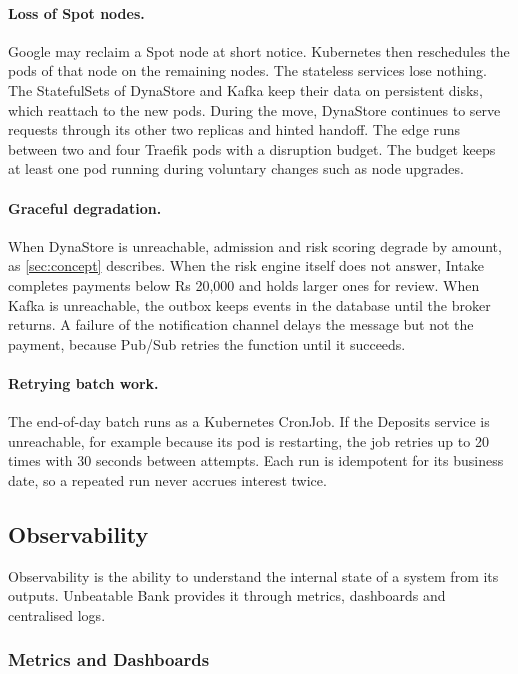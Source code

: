 \documentclass[11pt,a4paper]{article}
\newcommand{\project}{Unbeatable Bank}
\begin{document}
\paragraph{Loss of Spot nodes.} Google may reclaim a Spot node at short notice. Kubernetes then reschedules the pods of that node on the remaining nodes. The stateless services lose nothing. The StatefulSets of DynaStore and Kafka keep their data on persistent disks, which reattach to the new pods. During the move, DynaStore continues to serve requests through its other two replicas and hinted handoff. The edge runs between two and four Traefik pods with a disruption budget. The budget keeps at least one pod running during voluntary changes such as node upgrades.

\paragraph{Graceful degradation.} When DynaStore is unreachable, admission and risk scoring degrade by amount, as \cref{sec:concept} describes. When the risk engine itself does not answer, Intake completes payments below Rs 20,000 and holds larger ones for review. When Kafka is unreachable, the outbox keeps events in the database until the broker returns. A failure of the notification channel delays the message but not the payment, because Pub/Sub retries the function until it succeeds.

\paragraph{Retrying batch work.} The end-of-day batch runs as a Kubernetes CronJob. If the Deposits service is unreachable, for example because its pod is restarting, the job retries up to 20 times with 30 seconds between attempts. Each run is idempotent for its business date, so a repeated run never accrues interest twice.

\subsection{Observability}
\label{sec:observability}

Observability is the ability to understand the internal state of a system from its outputs. \project{} provides it through metrics, dashboards and centralised logs.

\subsubsection{Metrics and Dashboards}
\end{document}
